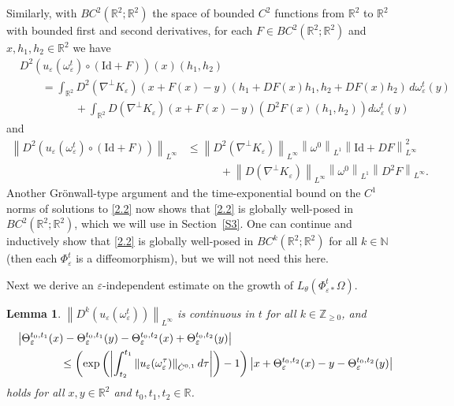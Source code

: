 \documentclass[reqno,centertags,12pt]{amsart}
\newtheorem{lemma}[theorem]{Lemma}
\theoremstyle{definition}
\numberwithin{equation}{section}
\newcommand{\abs}[1]{\left\lvert#1\right\rvert}
\newcommand{\norm}[1]{\left\|#1\right\|}
\newcommand{\lb}{\label}
\newcommand{\bbN}{{\mathbb{N}}}
\newcommand{\bbR}{{\mathbb{R}}}
\newcommand{\bbZ}{{\mathbb{Z}}}
\newcommand{\eps}{\varepsilon}
\newcommand{\tht}{\theta}
\begin{document}
Similarly, with $BC^{2}(\bbR^{2};\bbR^{2})$ the space of
bounded $C^{2}$ functions from $\bbR^{2}$ to $\bbR^{2}$ with bounded first and second derivatives,
for each $F\in BC^{2}(\bbR^{2};\bbR^{2})$ and $x,h_{1},h_{2}\in\bbR^{2}$ we have
\begin{align*}
    &D^{2}(u_{\eps}(\omega_{\eps}^{t})\circ(\mathrm{Id} + F))(x)(h_{1},h_{2})
    \\&\quad\quad = \int_{\bbR^{2}}D^{2}(\nabla^{\perp}K_{\eps})
    (x + F(x) - y)(h_{1} + DF(x)h_{1}, h_{2} + DF(x)h_{2})\,d\omega_{\eps}^{t}(y)
    \\&\quad\quad\quad\quad\quad
    + \int_{\bbR^{2}}D(\nabla^{\perp}K_{\eps})(x + F(x) - y)
    \left(D^{2}F(x)(h_{1}, h_{2})\right) d\omega_{\eps}^{t}(y)
\end{align*}
and
\begin{align*}
    \norm{D^{2}(u_{\eps}(\omega_{\eps}^{t})\circ(\mathrm{Id} + F))}_{L^{\infty}}
    &\leq \norm{D^{2}(\nabla^{\perp}K_{\eps})}_{L^{\infty}} \norm{\omega^{0}}_{L^{1}}
    \norm{\mathrm{Id} + DF}_{L^{\infty}}^{2}
    \\&\quad\quad\quad
    + \norm{D(\nabla^{\perp}K_{\eps})}_{L^{\infty}} \norm{\omega^{0}}_{L^{1}} \norm{D^{2}F}_{L^{\infty}}.
\end{align*}
Another Gr\"{o}nwall-type argument and the time-exponential bound on the $C^{1}$ norms of solutions to \eqref{2.2} 
now shows that \eqref{2.2} is globally well-posed in $BC^{2}(\bbR^{2};\bbR^{2})$, which we will use  in Section~\ref{S3}.
One can continue and inductively show that
\eqref{2.2} is globally well-posed in $BC^{k}(\bbR^{2};\bbR^{2})$ for all $k\in\bbN$ (then each $\Phi_{\eps}^{t}$ is a diffeomorphism), but we will not need this here.

Next we derive an $\eps$-independent estimate on the growth of
$L_{\tht}(\Phi_{\eps*}^{t}\Omega)$.

\begin{lemma}\label{L2.5}
    $\norm{D^{k}(u_{\eps}(\omega_{\eps}^{t}))}_{L^{\infty}}$ is continuous in $t$
    for all $k\in\bbZ_{\geq 0}$, and
    \begin{align}
        &\abs{\Theta_{\eps}^{t_{0},t_{1}}(x) - \Theta_{\eps}^{t_{0},t_{1}}(y)
        - \Theta_{\eps}^{t_{0},t_{2}}(x) + \Theta_{\eps}^{t_{0},t_{2}}(y)}  \notag
        \\&\qquad\qquad
        \leq \left(\exp\left(\abs{
            \int_{t_{2}}^{t_{1}}\norm{u_{\eps}(\omega_{\eps}^{\tau})}_{\dot{C}^{0,1}}d\tau
        }\right) - 1\right)
        \abs{x + \Theta_{\eps}^{t_{0},t_{2}}(x) - y - \Theta_{\eps}^{t_{0},t_{2}}(y)}  \lb{2.101}
    \end{align}
    holds for all $x,y\in\bbR^{2}$ and $t_{0},t_{1},t_{2}\in\bbR$.
\end{lemma}
\end{document}
